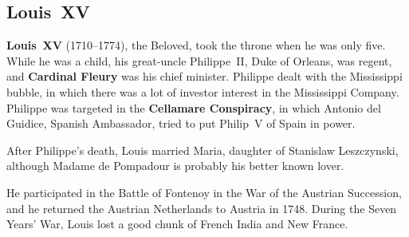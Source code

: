 \subsection*{Louis~XV}

\textbf{Louis~XV} (1710--1774), the Beloved, took the throne when he was only five.
While he was a child, his great-uncle Philippe~II, Duke of Orleans, was regent,
and \textbf{Cardinal Fleury} was his chief minister.
Philippe dealt with the Mississippi bubble,
in which there was a lot of investor interest in the Mississippi Company.
Philippe was targeted in the \textbf{Cellamare Conspiracy},
in which Antonio del Guidice, Spanish Ambassador, tried to put Philip~V of Spain in power.

After Philippe's death, Louis married Maria, daughter of Stanislaw Leszczynski,
although Madame de Pompadour is probably his better known lover.

He participated in the Battle of Fontenoy in the War of the Austrian Succession,
and he returned the Austrian Netherlands to Austria in 1748.
During the Seven Years' War, Louis lost a good chunk of French India and New France.
